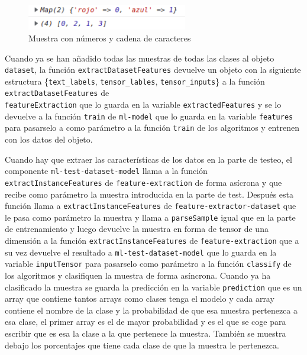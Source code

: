 \documentclass[a4paper, 12pt]{book}
\begin{document}
\begin{figure}
	\centering
	\includegraphics[width=7cm, keepaspectratio]{img/ejemplo2.png}
	\caption{Muestra con números y cadena de caracteres} 	\label{fig:ejemplo2}
\end{figure}

Cuando ya se han añadido todas las muestras de todas las clases al objeto \texttt{dataset}, la función \texttt{extractDatasetFeatures} devuelve un objeto con la siguiente estructura \{\texttt{text\_labels}, \texttt{tensor\_lables}, \texttt{tensor\_inputs}\} a la función \texttt{extractDatasetFeatures} de \\ \texttt{featureExtraction} que lo guarda en la variable \texttt{extractedFeatures} y se lo devuelve a la función \texttt{train} de \texttt{ml-model} que lo guarda en la variable \texttt{features} para pasarselo a como parámetro a la función \texttt{train} de los algoritmos y entrenen con los datos del objeto.

Cuando hay que extraer las características de los datos en la parte de testeo, el componente \texttt{ml-test-dataset-model} llama a la función \texttt{extractInstanceFeatures} de \texttt{feature-extraction} de forma asícrona y que recibe como parámetro la muestra introducida en la parte de test. Después esta función llama a \texttt{extractInstanceFeatures} de \texttt{feature-extractor-dataset} que le pasa como parámetro la muestra y llama a \texttt{parseSample} igual que en la parte de entrenamiento y luego devuelve la muestra en forma de tensor de una dimensión a la función \texttt{extractInstanceFeatures} de \texttt{feature-extraction} que a su vez devuelve el resultado a \texttt{ml-test-dataset-model} que lo guarda en la variable \texttt{inputTensor} para pasarselo como parámetro a la función \texttt{classify} de los algoritmos y clasifiquen la muestra de forma asíncrona. Cuando ya ha clasificado la muestra se guarda la predicción en la variable \texttt{prediction} que es un array que contiene tantos arrays como clases tenga el modelo y cada array contiene el nombre de la clase y la probabilidad de que esa muestra pertenezca a esa clase, el primer array es el de mayor probabilidad y es el que se coge para escribir que es esa la clase a la que pertenece la muestra. También se muestra debajo los porcentajes que tiene cada clase de que la muestra le pertenezca.
\end{document}
